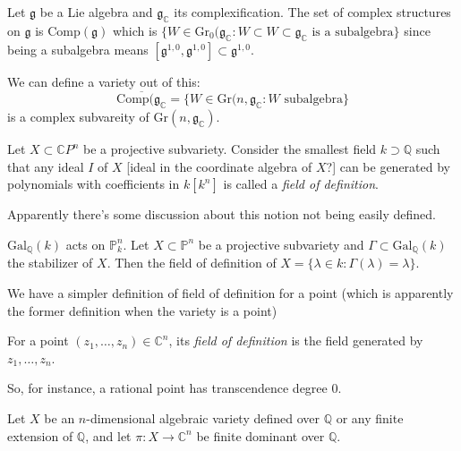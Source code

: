 \begin{definition}
\label{definition-}
Let $\mathfrak{g}$ be a Lie algebra and
$\mathfrak{g}_\mathbb{C}$
its complexification.
The set of complex structures on
$\mathfrak{g}$ is $\text{Comp}(\mathfrak{g})$
which is $\{ W \in
\text{Gr}_0(\mathfrak{g}_\mathbb{C}:
W \subset W \subset
\mathfrak{g}_{\mathbb{C}}\text{ is a
subalgebra}\}$
since being a subalgebra means
$[\mathfrak{g}^{1,0},\mathfrak{g}^{1,0}]
\subset \mathfrak{g}^{1,0}$.
\end{definition}

We can define a variety out of this:
$$
\overline{\text{Comp}(\mathfrak{g}
_{\mathbb{C}}}
=\{W \in
\text{Gr}(n,\mathfrak{g}_{\mathbb{C}}:
\text{$W$ subalgebra}\}
$$
is a complex subvareity of
$\text{Gr}(n,\mathfrak{g}_{\mathbb{C}})$.


\begin{definition}
\label{definition-field-of-defition}
Let $X \subset \mathbb{C}P^n$ be a projective
subvariety.
Consider the smallest field $k \supset
\mathbb{Q}$ such that
any ideal $I$ of $X$ [ideal in the coordinate
algebra of $X$?]
can be generated by polynomials with
coefficients
in $k[k^n]$ is called a {\it field of
definition}.
\end{definition}

\noindent
Apparently there's some discussion about this
notion
not being easily defined.

\begin{lemma}
\label{lemma-}
$\text{Gal}_{\mathbb{Q}}(k)$ acts on
$\mathbb{P}_k^n$.
Let $X \subset \mathbb{P}^n$ be a projective
subvariety
and $\Gamma \subset
\text{Gal}_{\mathbb{Q}}(k)$
the stabilizer of $X$.
Then the field of definition of $X=\{\lambda
\in k:\Gamma(\lambda)=\lambda\}$.
\end{lemma}

\noindent
We have a simpler definition of field of
definition for a point
(which is apparently the former definition
when the variety is a point)

\begin{definition}
\label{definition-field-of-definition-point}
For a point $(z_1,\ldots,z_n) \in
\mathbb{C}^n$, its
{\it field of definition} is the field
generated by $z_1,\ldots,z_n$.
\end{definition}

\noindent
So, for instance, a rational point has
transcendence degree 0.

\begin{remark}
\label{remark-}
Let $X$ be an $n$-dimensional algebraic
variety
defined over $\mathbb{Q}$ or any finite
extension of $\mathbb{Q}$,
and let $\pi:X\to \mathbb{C}^n$ be finite
dominant over $\mathbb{Q}$.
\end{remark}


